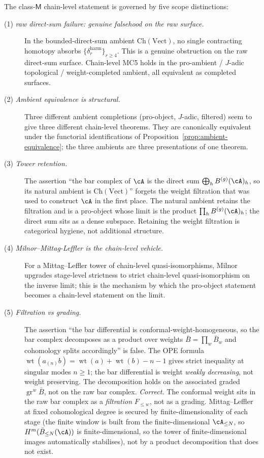 The class-$\mathsf{M}$ chain-level statement is governed by five
scope distinctions:
\begin{description}
\item[\textup{(1)} \emph{raw direct-sum failure: genuine falsehood on
the raw surface.}]
In the bounded-direct-sum ambient $\mathrm{Ch}(\mathrm{Vect})$,
no single contracting homotopy absorbs
$\{\delta_r^{\mathrm{harm}}\}_{r \geq 4}$. This is a genuine
obstruction on the raw direct-sum surface. Chain-level MC5 holds in
the pro-ambient / $J$-adic topological / weight-completed ambient, all
equivalent as completed surfaces.

\item[\textup{(2)} \emph{Ambient equivalence is structural.}]
Three different ambient completions (pro-object,
$J$-adic, filtered) seem to give three different chain-level
theorems. They are canonically equivalent under the functorial
identifications of
Proposition~\textup{\ref{prop:ambient-equivalence}}; the three ambients
are three presentations of one theorem.

\item[\textup{(3)} \emph{Tower retention.}]
The assertion ``the bar complex of $\cA$ is the direct sum
$\bigoplus_h B^{(g)}(\cA)_h$, so its natural ambient is
$\mathrm{Ch}(\mathrm{Vect})$'' forgets the weight filtration that was
used to construct $\cA$ in the first place. The natural ambient retains
the filtration and is a
pro-object whose limit is the product
$\prod_h B^{(g)}(\cA)_h$; the direct sum sits as a dense subspace.
Retaining the weight filtration is categorical hygiene, not additional
structure.

\item[\textup{(4)} \emph{Milnor--Mittag-Leffler is the chain-level
vehicle.}]
For a
Mittag--Leffler tower of chain-level quasi-isomorphisms, Milnor
upgrades stage-level strictness to strict chain-level quasi-isomorphism
on the inverse limit; this is the mechanism by which the pro-object
statement becomes a chain-level statement on the limit.

\item[\textup{(5)} \emph{Filtration vs grading.}]
The assertion ``the bar differential is conformal-weight-homogeneous,
so the bar complex decomposes as a product over weights
$\bar B = \prod_w \bar B_w$ and cohomology splits accordingly'' is
false. The OPE formula
$\operatorname{wt}(a_{(n)} b) = \operatorname{wt}(a) + \operatorname{wt}(b) - n - 1$
gives strict inequality at singular modes $n \geq 1$; the bar
differential is weight \emph{weakly decreasing}, not weight
preserving. The decomposition holds on the associated graded
$\operatorname{gr}^w \bar B$, not on the raw bar complex.
\emph{Correct.} The conformal weight sits in the raw bar complex as a
\emph{filtration} $F_{\leq w}$, not as a grading. Mittag--Leffler at
fixed cohomological degree is secured by finite-dimensionality of each
stage (the finite window is built from the finite-dimensional
$\cA_{\leq N}$, so
$H^m(\bar B_{\leq N}(\cA))$ is finite-dimensional, so the tower of
finite-dimensional images automatically stabilises), not by a product
decomposition that does not exist.
\end{description}


